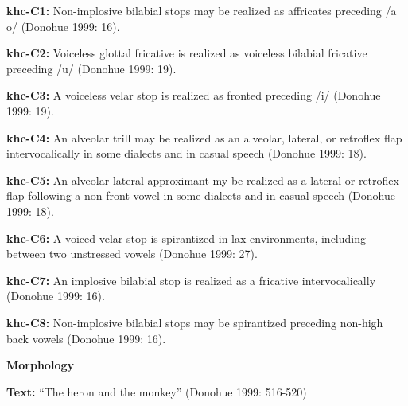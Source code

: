 \begin{styleBody}
\textbf{khc-C1: }Non-implosive bilabial stops may be realized as affricates preceding /a o/ (Donohue 1999: 16).
\end{styleBody}

\begin{styleBody}
\textbf{khc-C2: }Voiceless glottal fricative is realized as voiceless bilabial fricative preceding /u/ (Donohue 1999: 19).
\end{styleBody}

\begin{styleBody}
\textbf{khc-C3: }A voiceless velar stop is realized as fronted preceding /i/ (Donohue 1999: 19).
\end{styleBody}

\begin{styleBody}
\textbf{khc-C4: }An alveolar trill may be realized as an alveolar, lateral, or retroflex flap intervocalically in some dialects and in casual speech (Donohue 1999: 18).
\end{styleBody}

\begin{styleBody}
\textbf{khc-C5: }An alveolar lateral approximant my be realized as a lateral or retroflex flap following a non-front vowel in some dialects and in casual speech (Donohue 1999: 18).
\end{styleBody}

\begin{styleBody}
\textbf{khc-C6: }A voiced velar stop is spirantized in lax environments, including between two unstressed vowels (Donohue 1999: 27).
\end{styleBody}

\begin{styleBody}
\textbf{khc-C7: }An implosive bilabial stop is realized as a fricative intervocalically (Donohue 1999: 16).
\end{styleBody}

\begin{styleBody}
\textbf{khc-C8: }Non-implosive bilabial stops may be spirantized preceding non-high back vowels (Donohue 1999: 16).
\end{styleBody}

\begin{styleBody}
\textbf{Morphology}
\end{styleBody}

\begin{styleBody}
\textbf{Text:} “The heron and the monkey” (Donohue 1999: 516-520)
\end{styleBody}

